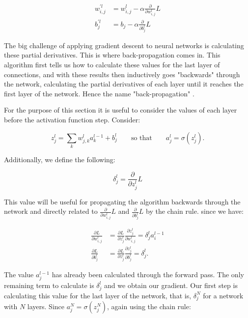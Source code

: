 \begin{align*}
  w^{\prime l}_{i, j} &= w^l_{i, j} - \alpha  \frac{\partial}{\partial w^l_{i, j}} L\\
  b^{\prime l}_j &= b_j - \alpha \frac{\partial}{\partial b^l_j} L
\end{align*}

The big challenge of applying gradient descent to neural networks is calculating these partial derivatives.  This is where back-propagation comes in. This algorithm first tells us how to calculate these values for the last layer of connections, and with these results then inductively goes "backwards" through the network, calculating the partial derivatives of each layer until it reaches the first layer of the network. Hence the name "back-propagation" \cite{Guil}.

For the purpose of this section it is useful to consider the values of each layer before the activation function step. Consider:

\begin{equation*}
  z^l_j = \sum_k w^l_{j, k} a^{l - 1}_k + b^l_j \qquad \text{so that} \qquad a^l_j = \sigma (z^l_j).
\end{equation*}

Additionally, we define the following:

\begin{equation}
  \delta^l_j = \frac{\partial}{\partial z^l_j} L
\end{equation}

This value will be useful for propagating the algorithm backwards through the network and directly related to $\frac{\partial}{\partial w^l_{i, j}} L$ and $\frac{\partial}{\partial b^l_j} L$ by the chain rule. since we have:

\begin{align}
  \frac{\partial L}{\partial w^l_{i, j}}  &= \frac{\partial L}{\partial z^l_j} \frac{\partial z^l_j}{\partial w^l_{i, j}} = \delta^l_j a^{l - 1}_i \\
  \frac{\partial L}{\partial b^l_j} &= \frac{\partial L}{\partial z^l_j} \frac{\partial z^l_j}{\partial b^l_j} = \delta^l_j.
\end{align}

The value $a^{l - 1}_j$ has already been calculated through the forward pass. The only remaining term to calculate is $\delta^l_j$ and we obtain our gradient. Our first step is calculating this value for the last layer of the network, that is, $\delta^N_j$ for a network with $N$ layers. Since $a^{N}_j = \sigma (z^N_j)$, again using the chain rule:

